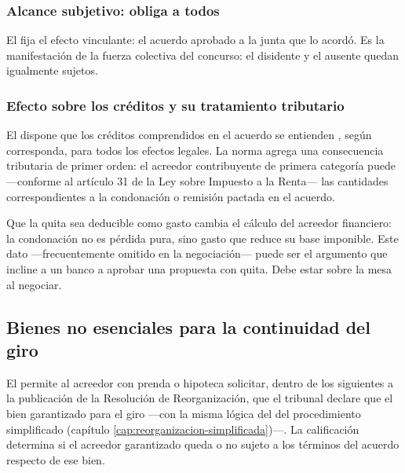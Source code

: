\subsubsection{Alcance subjetivo: obliga a todos}

El  fija el efecto vinculante: el acuerdo aprobado  a la junta que lo acordó. Es la
manifestación de la fuerza colectiva del concurso: el disidente y el ausente quedan igualmente
sujetos.

\subsubsection{Efecto sobre los créditos y su tratamiento tributario}

El  dispone que los créditos comprendidos en el acuerdo se entienden , según corresponda, para todos los efectos legales. La norma agrega una
consecuencia tributaria de primer orden: el acreedor contribuyente de primera categoría puede
 ---conforme al artículo 31  de la Ley sobre Impuesto a la Renta--- las cantidades
correspondientes a la condonación o remisión pactada en el acuerdo.

\begin{foco}
Que la quita sea deducible como gasto cambia el cálculo del acreedor financiero: la condonación
no es pérdida pura, sino gasto que reduce su base imponible. Este dato ---frecuentemente omitido
en la negociación--- puede ser el argumento que incline a un banco a aprobar una propuesta con
quita. Debe estar sobre la mesa al negociar.
\end{foco}

\subsection{Bienes no esenciales para la continuidad del giro}

El  permite al acreedor con prenda o hipoteca solicitar, dentro de los  siguientes a la publicación de la Resolución de Reorganización, que el tribunal declare
que el bien garantizado  para el giro ---con la misma lógica del
 del procedimiento simplificado (capítulo \ref{cap:reorganizacion-simplificada})---.
La calificación determina si el acreedor garantizado queda o no sujeto a los términos del
acuerdo respecto de ese bien.

